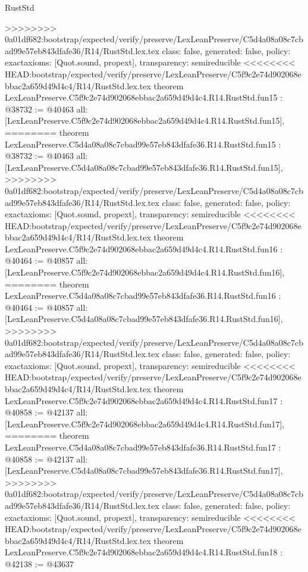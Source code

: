 \begin{lexlean}{RustStd}
\begin{coremodule}
{\begin{coremodule}
{{{{{{{{{{{{{{{{{{>>>>>>>> 0a01df682:bootstrap/expected/verify/preserve/LexLeanPreserve/C5d4a08a08c7cbad99e57eb843dfafe36/R14/RustStd.lex.tex
  class: false,
  generated: false,
  policy: exact{axioms: [Quot.sound, propext]},
  transparency: semireducible
}
<<<<<<<< HEAD:bootstrap/expected/verify/preserve/LexLeanPreserve/C5f9c2e74d902068ebbac2a659d49d4c4/R14/RustStd.lex.tex
theorem LexLeanPreserve.C5f9c2e74d902068ebbac2a659d49d4c4.R14.RustStd.fun15 : @38732 := @40463 {
  all: [LexLeanPreserve.C5f9c2e74d902068ebbac2a659d49d4c4.R14.RustStd.fun15],
========
theorem LexLeanPreserve.C5d4a08a08c7cbad99e57eb843dfafe36.R14.RustStd.fun15 : @38732 := @40463 {
  all: [LexLeanPreserve.C5d4a08a08c7cbad99e57eb843dfafe36.R14.RustStd.fun15],
>>>>>>>> 0a01df682:bootstrap/expected/verify/preserve/LexLeanPreserve/C5d4a08a08c7cbad99e57eb843dfafe36/R14/RustStd.lex.tex
  class: false,
  generated: false,
  policy: exact{axioms: [Quot.sound, propext]},
  transparency: semireducible
}
<<<<<<<< HEAD:bootstrap/expected/verify/preserve/LexLeanPreserve/C5f9c2e74d902068ebbac2a659d49d4c4/R14/RustStd.lex.tex
theorem LexLeanPreserve.C5f9c2e74d902068ebbac2a659d49d4c4.R14.RustStd.fun16 : @40464 := @40857 {
  all: [LexLeanPreserve.C5f9c2e74d902068ebbac2a659d49d4c4.R14.RustStd.fun16],
========
theorem LexLeanPreserve.C5d4a08a08c7cbad99e57eb843dfafe36.R14.RustStd.fun16 : @40464 := @40857 {
  all: [LexLeanPreserve.C5d4a08a08c7cbad99e57eb843dfafe36.R14.RustStd.fun16],
>>>>>>>> 0a01df682:bootstrap/expected/verify/preserve/LexLeanPreserve/C5d4a08a08c7cbad99e57eb843dfafe36/R14/RustStd.lex.tex
  class: false,
  generated: false,
  policy: exact{axioms: [Quot.sound, propext]},
  transparency: semireducible
}
<<<<<<<< HEAD:bootstrap/expected/verify/preserve/LexLeanPreserve/C5f9c2e74d902068ebbac2a659d49d4c4/R14/RustStd.lex.tex
theorem LexLeanPreserve.C5f9c2e74d902068ebbac2a659d49d4c4.R14.RustStd.fun17 : @40858 := @42137 {
  all: [LexLeanPreserve.C5f9c2e74d902068ebbac2a659d49d4c4.R14.RustStd.fun17],
========
theorem LexLeanPreserve.C5d4a08a08c7cbad99e57eb843dfafe36.R14.RustStd.fun17 : @40858 := @42137 {
  all: [LexLeanPreserve.C5d4a08a08c7cbad99e57eb843dfafe36.R14.RustStd.fun17],
>>>>>>>> 0a01df682:bootstrap/expected/verify/preserve/LexLeanPreserve/C5d4a08a08c7cbad99e57eb843dfafe36/R14/RustStd.lex.tex
  class: false,
  generated: false,
  policy: exact{axioms: [Quot.sound, propext]},
  transparency: semireducible
}
<<<<<<<< HEAD:bootstrap/expected/verify/preserve/LexLeanPreserve/C5f9c2e74d902068ebbac2a659d49d4c4/R14/RustStd.lex.tex
theorem LexLeanPreserve.C5f9c2e74d902068ebbac2a659d49d4c4.R14.RustStd.fun18 : @42138 := @43637 {
}}}}}}}}}}}}}}}}}}}}}
\end{coremodule}}
\end{coremodule}
\end{lexlean}
